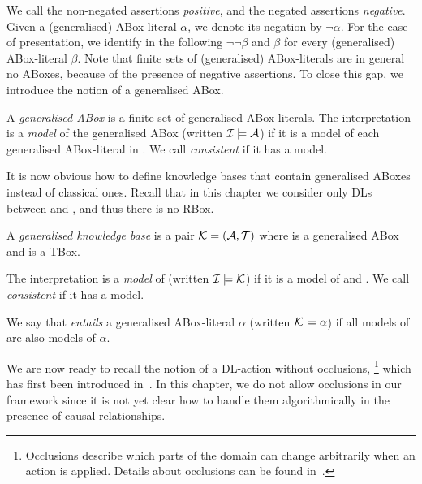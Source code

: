 \noindent
We call the non-negated assertions \emph{positive}, and the negated assertions
\emph{negative}.  Given a (generalised) ABox-literal $\alpha$, we denote its
negation by $\lnot\alpha$.  For the ease of presentation, we identify in the
following $\lnot\lnot\beta$ and $\beta$ for every (generalised) ABox-literal
$\beta$.
%
Note that finite sets of (generalised) ABox-literals are in general no ABoxes,
because of the presence of negative assertions.  To close this gap, we introduce
the notion of a generalised ABox.

\begin{definition}
    A \emph{generalised ABox} is a finite set of generalised ABox-literals.  The
    interpretation \Imc is a \emph{model} of the generalised ABox \Amc (written
    $\mathcal{I}\models\mathcal{A}$) if it is a model of each generalised ABox-literal in
    \Amc.  We call \Amc \emph{consistent} if it has a model.
\end{definition}

\noindent
It is now obvious how to define knowledge bases that contain generalised ABoxes
instead of classical ones.  Recall that in this chapter we consider only DLs
between \ALC and \ALCQIO, and thus there is no RBox.

\begin{definition}
    A \emph{generalised knowledge base} is a pair $\mathcal{K}=(\mathcal{A},\mathcal{T})$
    where \Amc is a generalised ABox and \Tmc is a TBox.

    The interpretation \Imc is a \emph{model} of \Kmc (written
    $\mathcal{I}\models\mathcal{K}$) if it is a model of \Amc and \Tmc.  We call \Kmc
    \emph{consistent} if it has a model.

    We say that \Kmc \emph{entails} a generalised ABox-literal $\alpha$ (written
    $\mathcal{K}\models\alpha$) if all models of \Kmc are also models of $\alpha$.
\end{definition}

\noindent
We are now ready to recall the notion of a DL-action without occlusions,%
\footnote{Occlusions describe which parts of the domain can change arbitrarily
when an action is applied.  Details about occlusions can be found
in~\cite{BLM+-AAAI05}.}
which has first been introduced in~\cite{BLM+-AAAI05}.  In this chapter, we do
not allow occlusions in our framework since it is not yet clear how to handle
them algorithmically in the presence of causal relationships.

